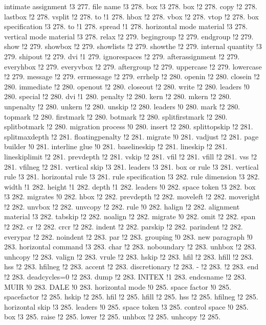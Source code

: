 intimate assignment !3 277.
file name !3 278.
box !3 278.
box !2 278.
copy !2 278.
lastbox !2 278.
vsplit !2 278.
to !1 278.
hbox !2 278.
vbox !2 278.
vtop !2 278.
box specification !3 278.
to !1 278.
spread !1 278.
horizontal mode material !3 278.
vertical mode material !3 278.
relax !2 279.
begingroup !2 279.
endgroup !2 279.
show !2 279.
showbox !2 279.
showlists !2 279.
showthe !2 279.
internal quantity !3 279.
shipout !2 279.
dvi !1 279.
ignorespaces !2 279.
afterassignment !2 279.
everyhbox !2 279.
everyvbox !2 279.
aftergroup !2 279.
uppercase !2 279.
lowercase !2 279.
message !2 279.
errmessage !2 279.
errhelp !2 280.
openin !2 280.
closein !2 280.
immediate !2 280.
openout !2 280.
closeout !2 280.
write !2 280.
leaders !0 280.
special !2 280.
dvi !1 280.
penalty !2 280.
kern !2 280.
mkern !2 280.
unpenalty !2 280.
unkern !2 280.
unskip !2 280.
leaders !0 280.
mark !2 280.
topmark !2 280.
firstmark !2 280.
botmark !2 280.
splitfirstmark !2 280.
splitbotmark !2 280.
migration process !0 280.
insert !2 280.
splittopskip !2 281.
splitmaxdepth !2 281.
floatingpenalty !2 281.
migrate !0 281.
vadjust !2 281.
page builder !0 281.
interline glue !0 281.
baselineskip !2 281.
lineskip !2 281.
lineskiplimit !2 281.
prevdepth !2 281.
vskip !2 281.
vfil !2 281.
vfill !2 281.
vss !2 281.
vfilneg !2 281.
vertical skip !3 281.
leaders !3 281.
box or rule !3 281.
vertical rule !3 281.
horizontal rule !3 281.
rule specification !3 282.
rule dimension !3 282.
width !1 282.
height !1 282.
depth !1 282.
leaders !0 282.
space token !3 282.
box !3 282.
migrates !0 282.
hbox !2 282.
prevdepth !2 282.
moveleft !2 282.
moveright !2 282.
unvbox !2 282.
unvcopy !2 282.
rule !0 282.
halign !2 282.
alignment material !3 282.
tabskip !2 282.
noalign !2 282.
migrate !0 282.
omit !2 282.
span !2 282.
cr !2 282.
crcr !2 282.
indent !2 282.
parskip !2 282.
parindent !2 282.
everypar !2 282.
noindent !2 283.
par !2 283.
grouping !0 283.
new paragraph !0 283.
horizontal command !3 283.
char !2 283.
noboundary !2 283.
unhbox !2 283.
unhcopy !2 283.
valign !2 283.
vrule !2 283.
hskip !2 283.
hfil !2 283.
hfill !2 283.
hss !2 283.
hfilneg !2 283.
accent !2 283.
discretionary !2 283.
- !2 283.
 !2 283.
end !2 283.
deadcycles=0 !2 283.
dump !2 283.
INITEX !1 283.
endcsname !2 283.
MUIR !0 283.
DALE !0 283.
horizontal mode !0 285.
space factor !0 285.
spacefactor !2 285.
hskip !2 285.
hfil !2 285.
hfill !2 285.
hss !2 285.
hfilneg !2 285.
horizontal skip !3 285.
leaders !0 285.
space token !3 285.
control space !0 285.
box !3 285.
raise !2 285.
lower !2 285.
unhbox !2 285.
unhcopy !2 285.
